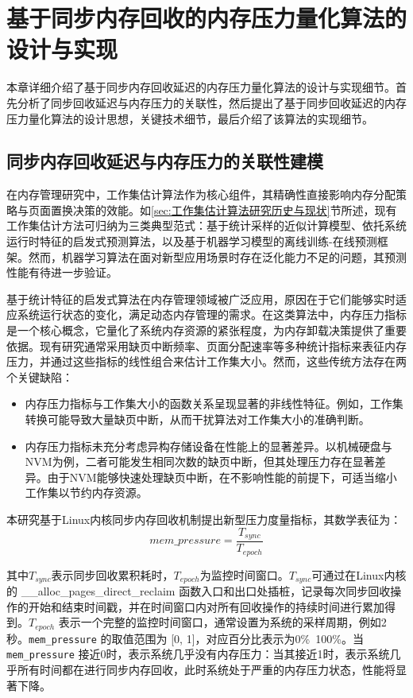 \chapter{基于同步内存回收的内存压力量化算法的设计与实现}
\label{chap:基于同步内存回收的内存压力量化算法的设计与实现}
本章详细介绍了基于同步内存回收延迟的内存压力量化算法的设计与实现细节。首先分析了同步回收延迟与内存压力的关联性，然后提出了基于同步回收延迟的内存压力量化算法的设计思想，关键技术细节，最后介绍了该算法的实现细节。

\section{同步内存回收延迟与内存压力的关联性建模}

在内存管理研究中，工作集估计算法作为核心组件，其精确性直接影响内存分配策略与页面置换决策的效能。如\ref{sec:工作集估计算法研究历史与现状}节所述，现有工作集估计方法可归纳为三类典型范式：基于统计采样的近似计算模型、依托系统运行时特征的启发式预测算法，以及基于机器学习模型的离线训练-在线预测框架。然而，机器学习算法在面对新型应用场景时存在泛化能力不足的问题，其预测性能有待进一步验证。

基于统计特征的启发式算法在内存管理领域被广泛应用，原因在于它们能够实时适应系统运行状态的变化，满足动态内存管理的需求。在这类算法中，内存压力指标是一个核心概念，它量化了系统内存资源的紧张程度，为内存卸载决策提供了重要依据。现有研究通常采用缺页中断频率、页面分配速率等多种统计指标来表征内存压力，并通过这些指标的线性组合来估计工作集大小。然而，这些传统方法存在两个关键缺陷：

\begin{itemize}
    \item 内存压力指标与工作集大小的函数关系呈现显著的非线性特征。例如，工作集转换可能导致大量缺页中断，从而干扰算法对工作集大小的准确判断。
    \item 内存压力指标未充分考虑异构存储设备在性能上的显著差异。以机械硬盘与NVM为例，二者可能发生相同次数的缺页中断，但其处理压力存在显著差异。由于NVM能够快速处理缺页中断，在不影响性能的前提下，可适当缩小工作集以节约内存资源。
\end{itemize}

本研究基于Linux内核同步内存回收机制提出新型压力度量指标，其数学表征为：
\begin{equation}
    \label{eq:mem_pressure}
    mem\_pressure = \frac{T_{sync}}{T_{epoch}}
\end{equation}

其中\(T_{sync}\)表示同步回收累积耗时，\(T_{epoch}\)为监控时间窗口。\(T_{sync}\)可通过在Linux内核的 \_\_alloc\_pages\_direct\_reclaim 函数入口和出口处插桩，记录每次同步回收操作的开始和结束时间戳，并在时间窗口内对所有回收操作的持续时间进行累加得到。\(T_{epoch}\) 表示一个完整的监控时间窗口，通常设置为系统的采样周期，例如2秒。\texttt{mem\_pressure} 的取值范围为 [0, 1]，对应百分比表示为0\%~100\%。当 \texttt{mem\_pressure} 接近0时，表示系统几乎没有内存压力：当其接近1时，表示系统几乎所有时间都在进行同步内存回收，此时系统处于严重的内存压力状态，性能将显著下降。

